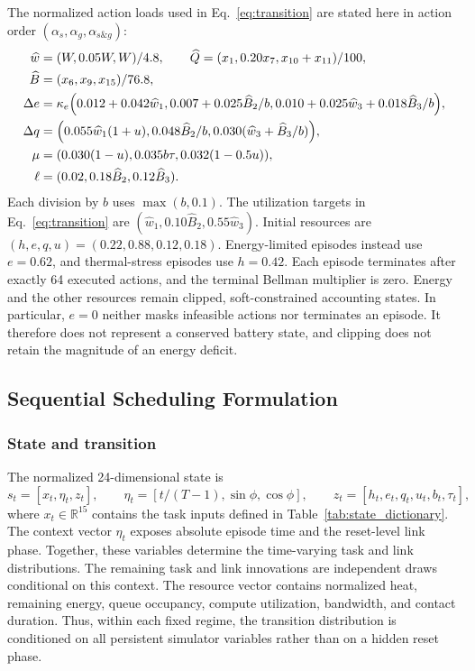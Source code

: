 \documentclass[remotesensing,article,submit,moreauthors]{Definitions/mdpi}
\newcommand{\R}{\mathbb{R}}
\begin{document}
The normalized action loads used in Eq.~\eqref{eq:transition} are stated here in action order $(\alpha_s,\alpha_g,\alpha_{s\&g})$:
\begin{align}
\widehat w&=(W,0.05W,W)/4.8,\qquad
\widehat Q=(x_1,0.20x_7,x_{10}+x_{11})/100,\notag\\
\widehat B&=(x_6,x_9,x_{15})/76.8,\notag\\
\Delta e&=\kappa_e\left(0.012+0.042\widehat w_1,
0.007+0.025\widehat B_2/b,
0.010+0.025\widehat w_3+0.018\widehat B_3/b\right),\notag\\
\Delta q&=\left(0.055\widehat w_1(1+u),
0.048\widehat B_2/b,
0.030(\widehat w_3+\widehat B_3/b)\right),\notag\\
\mu&=\left(0.030(1-u),0.035b\tau,0.032(1-0.5u)\right),\notag\\
\ell&=(0.02,0.18\widehat B_2,0.12\widehat B_3).
\label{eq:action_loads}
\end{align}
Each division by $b$ uses $\max(b,0.1)$. The utilization targets in Eq.~\eqref{eq:transition} are $(\widehat w_1,0.10\widehat B_2,0.55\widehat w_3)$. Initial resources are $(h,e,q,u)=(0.22,0.88,0.12,0.18)$. Energy-limited episodes instead use $e=0.62$, and thermal-stress episodes use $h=0.42$. Each episode terminates after exactly 64 executed actions, and the terminal Bellman multiplier is zero. Energy and the other resources remain clipped, soft-constrained accounting states. In particular, $e=0$ neither masks infeasible actions nor terminates an episode. It therefore does not represent a conserved battery state, and clipping does not retain the magnitude of an energy deficit.

\subsection{Sequential Scheduling Formulation}
\label{sec:mdp}

\subsubsection{State and transition}

The normalized 24-dimensional state is
\begin{equation}
s_t=[x_t,\eta_t,z_t],\qquad
\eta_t=[t/(T-1),\sin\phi,\cos\phi],\qquad
z_t=[h_t,e_t,q_t,u_t,b_t,\tau_t],
\end{equation}
where $x_t\in\R^{15}$ contains the task inputs defined in Table~\ref{tab:state_dictionary}. The context vector $\eta_t$ exposes absolute episode time and the reset-level link phase. Together, these variables determine the time-varying task and link distributions. The remaining task and link innovations are independent draws conditional on this context. The resource vector contains normalized heat, remaining energy, queue occupancy, compute utilization, bandwidth, and contact duration. Thus, within each fixed regime, the transition distribution is conditioned on all persistent simulator variables rather than on a hidden reset phase.
\end{document}
